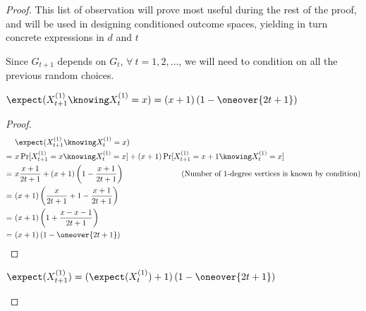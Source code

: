 \begin{proof}
    This list of observation will prove most useful during the rest of the proof, and will be used in designing conditioned outcome spaces, yielding in turn concrete expressions in $d$ and $t$

    \vbox{}
    

    \vbox{}
        
    Since $G_{t + 1}$ depends on $G_t$, $\forall\ t = 1,2,\ldots$, we will need to condition on all the previous random choices.

    \begin{lem}\label{l:pref-att-1}
        $\displaystyle \expect(X_{t + 1}^{(1)} \knowing X_t^{(1)} = x) = (x + 1) \left( 1 - \oneover{2t + 1} \right)$
    \end{lem}

    \begin{proof}
        \begin{align*}
             &\ \expect(X_{t + 1}^{(1)} \knowing X_t^{(1)} = x)                                 & \phantom{mmmmmmmmmm}                              \\
            =&\ x \Pr[X_{t + 1}^{(1)} = x \knowing X_t^{(1)} = x] + (x + 1) \Pr[X_{t + 1}^{(1)} = x + 1 \knowing X_t^{(1)} = x] &                   \\
            =&\ x \frac{x + 1}{2t + 1} + (x + 1) \left( 1 - \frac{x + 1}{2t + 1} \right)        & \mathllap{\text{(Number of 1-degree vertices is known by condition)}} \\
            =&\ (x + 1) \left( \frac{x}{2t + 1} + 1 - \frac{x + 1}{2t + 1} \right)              &                                                   \\
            =&\ (x + 1) \left( 1 + \frac{x - x - 1}{2t + 1} \right)                             &                                                   \\
            =&\ (x + 1) \left( 1 - \oneover{2t + 1} \right)                                     &                                                   \\
        \end{align*}
    \end{proof}

    \begin{lem}\label{l:pref-att-2}
        $\displaystyle \expect(X_{t + 1}^{(1)}) = (\expect(X_t^{(1)}) + 1)  \left(1 - \oneover{2t + 1} \right)$
    \end{lem}


\end{proof}
